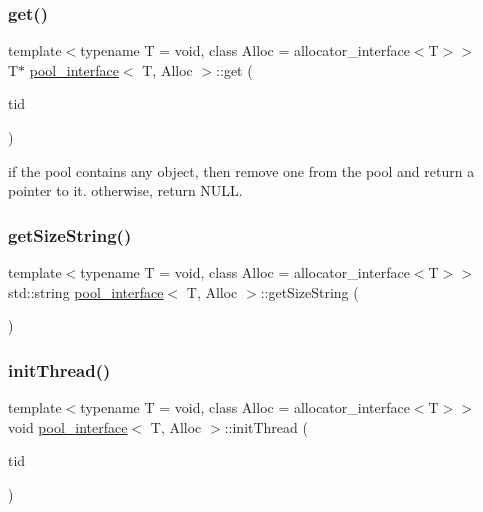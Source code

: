 \mbox{\label{classpool__interface_a813149cd8f557d17871478324073f4e1}} 
\subsubsection{\texorpdfstring{get()}{get()}}
{\footnotesize\ttfamily template$<$typename T  = void, class Alloc  = allocator\+\_\+interface$<$\+T$>$$>$ \\
T$\ast$ \hyperlink{classpool__interface}{pool\+\_\+interface}$<$ T, Alloc $>$\+::get (\begin{DoxyParamCaption}\item[{const int}]{tid }\end{DoxyParamCaption})\hspace{0.3cm}{\ttfamily [inline]}}

if the pool contains any object, then remove one from the pool and return a pointer to it. otherwise, return N\+U\+LL. \mbox{\label{classpool__interface_a9cf0d8a1beeea10001a2386954c35148}} 
\subsubsection{\texorpdfstring{get\+Size\+String()}{getSizeString()}}
{\footnotesize\ttfamily template$<$typename T  = void, class Alloc  = allocator\+\_\+interface$<$\+T$>$$>$ \\
std\+::string \hyperlink{classpool__interface}{pool\+\_\+interface}$<$ T, Alloc $>$\+::get\+Size\+String (\begin{DoxyParamCaption}{ }\end{DoxyParamCaption})\hspace{0.3cm}{\ttfamily [inline]}}

\mbox{\label{classpool__interface_a2415e8d6726ecfc1e13b45e0a81ba573}} 
\subsubsection{\texorpdfstring{init\+Thread()}{initThread()}}
{\footnotesize\ttfamily template$<$typename T  = void, class Alloc  = allocator\+\_\+interface$<$\+T$>$$>$ \\
void \hyperlink{classpool__interface}{pool\+\_\+interface}$<$ T, Alloc $>$\+::init\+Thread (\begin{DoxyParamCaption}\item[{const int}]{tid }\end{DoxyParamCaption})}




